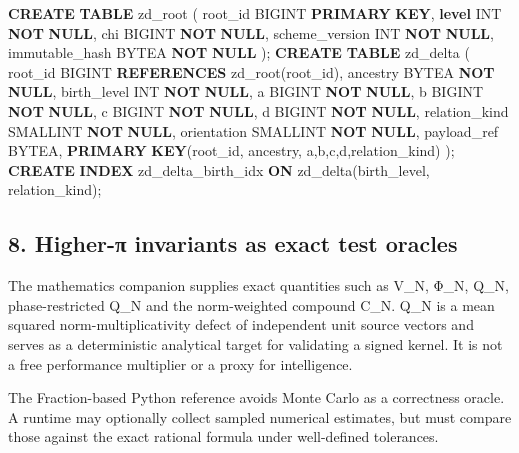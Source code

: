 \documentclass[
  10pt,
]{article}
\newenvironment{Shaded}{}{}
\newcommand{\DataTypeTok}[1]{\textcolor[rgb]{0.56,0.13,0.00}{#1}}
\newcommand{\KeywordTok}[1]{\textcolor[rgb]{0.00,0.44,0.13}{\textbf{#1}}}
\newcommand{\NormalTok}[1]{#1}
\begin{document}
\begin{Shaded}
\begin{Highlighting}[]
\KeywordTok{CREATE} \KeywordTok{TABLE}\NormalTok{ zd\_root (}
\NormalTok{  root\_id BIGINT }\KeywordTok{PRIMARY} \KeywordTok{KEY}\NormalTok{,}
  \KeywordTok{level} \DataTypeTok{INT} \KeywordTok{NOT} \KeywordTok{NULL}\NormalTok{,}
\NormalTok{  chi BIGINT }\KeywordTok{NOT} \KeywordTok{NULL}\NormalTok{,}
\NormalTok{  scheme\_version }\DataTypeTok{INT} \KeywordTok{NOT} \KeywordTok{NULL}\NormalTok{,}
\NormalTok{  immutable\_hash BYTEA }\KeywordTok{NOT} \KeywordTok{NULL}
\NormalTok{);}
\KeywordTok{CREATE} \KeywordTok{TABLE}\NormalTok{ zd\_delta (}
\NormalTok{  root\_id BIGINT }\KeywordTok{REFERENCES}\NormalTok{ zd\_root(root\_id),}
\NormalTok{  ancestry BYTEA }\KeywordTok{NOT} \KeywordTok{NULL}\NormalTok{,}
\NormalTok{  birth\_level }\DataTypeTok{INT} \KeywordTok{NOT} \KeywordTok{NULL}\NormalTok{,}
\NormalTok{  a BIGINT }\KeywordTok{NOT} \KeywordTok{NULL}\NormalTok{, b BIGINT }\KeywordTok{NOT} \KeywordTok{NULL}\NormalTok{,}
\NormalTok{  c BIGINT }\KeywordTok{NOT} \KeywordTok{NULL}\NormalTok{, d BIGINT }\KeywordTok{NOT} \KeywordTok{NULL}\NormalTok{,}
\NormalTok{  relation\_kind }\DataTypeTok{SMALLINT} \KeywordTok{NOT} \KeywordTok{NULL}\NormalTok{,}
\NormalTok{  orientation }\DataTypeTok{SMALLINT} \KeywordTok{NOT} \KeywordTok{NULL}\NormalTok{,}
\NormalTok{  payload\_ref BYTEA,}
  \KeywordTok{PRIMARY} \KeywordTok{KEY}\NormalTok{(root\_id, ancestry, a,b,c,d,relation\_kind)}
\NormalTok{);}
\KeywordTok{CREATE} \KeywordTok{INDEX}\NormalTok{ zd\_delta\_birth\_idx }\KeywordTok{ON}\NormalTok{ zd\_delta(birth\_level, relation\_kind);}
\end{Highlighting}
\end{Shaded}

\subsection{8. Higher-π invariants as exact test
oracles}\label{higher-ux3c0-invariants-as-exact-test-oracles}

The mathematics companion supplies exact quantities such as V\_N, Φ\_N,
Q\_N, phase-restricted Q\_N and the norm-weighted compound C\_N. Q\_N is
a mean squared norm-multiplicativity defect of independent unit source
vectors and serves as a deterministic analytical target for validating a
signed kernel. It is not a free performance multiplier or a proxy for
intelligence.

The Fraction-based Python reference avoids Monte Carlo as a correctness
oracle. A runtime may optionally collect sampled numerical estimates,
but must compare those against the exact rational formula under
well-defined tolerances.
\end{document}
